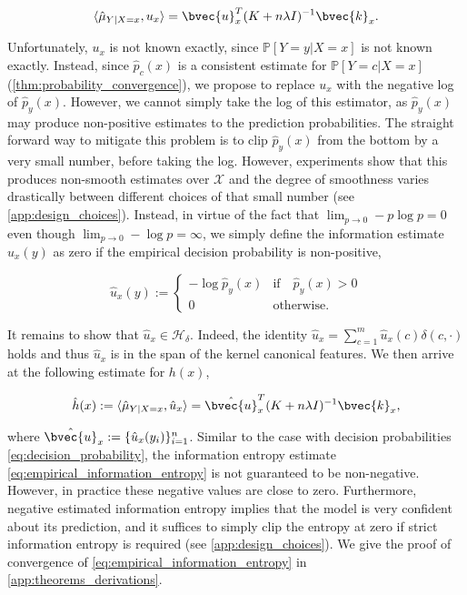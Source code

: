 \documentclass{article}
\begin{document}
	\begin{equation}
		\langle \hat{\mu}_{Y | X = x}, u_{x} \rangle = \bvec{u}_{x}^{T} (K + n \lambda I)^{-1} \bvec{k}_{x}.
	\end{equation}
	
	Unfortunately, $u_{x}$ is not known exactly, since $\mathbb{P}[Y = y | X = x]$ is not known exactly. Instead, since $\hat{p}_{c}(x)$ is a consistent estimate for $\mathbb{P}[Y = c | X = x]$ (\cref{thm:probability_convergence}), we propose to replace $u_{x}$ with the negative log of $\hat{p}_{y}(x)$. However, we cannot simply take the log of this estimator, as $\hat{p}_{y}(x)$ may produce non-positive estimates to the prediction probabilities. The straight forward way to mitigate this problem is to clip $\hat{p}_{y}(x)$ from the bottom by a very small number, before taking the log. However, experiments show that this produces non-smooth estimates over $\mathcal{X}$ and the degree of smoothness varies drastically between different choices of that small number (see \cref{app:design_choices}). Instead, in virtue of the fact that $\lim_{p \to 0} - p \log{p} = 0$ even though $\lim_{p \to 0} - \log{p} = \infty$, we simply define the information estimate $\hat{u}_{x}(y)$ as zero if the empirical decision probability is non-positive,
	
	\begin{equation}
		\hat{u}_{x}(y) := \begin{cases}
		- \log{\hat{p}_{y}(x)} & \mathrm{if } \quad \hat{p}_{y}(x) > 0 \\
		0 & \mathrm{otherwise}. \end{cases}
	\label{eq:empirical_information}
	\end{equation}
	
	It remains to show that $\hat{u}_{x} \in \mathcal{H}_{\delta}$. Indeed, the identity $\hat{u}_{x} = \sum_{c = 1}^{m} \hat{u}_{x}(c) \delta(c, \cdot)$ holds and thus $\hat{u}_{x}$ is in the span of the kernel canonical features. We then arrive at the following estimate for $h(x)$,
	
	\begin{equation}
		\hat{h}(x) := \langle \hat{\mu}_{Y | X = x}, \hat{u}_{x} \rangle = \hat{\bvec{u}}_{x}^{T} (K + n \lambda I)^{-1} \bvec{k}_{x},
		\label{eq:empirical_information_entropy}
	\end{equation}
	
	where $\hat{\bvec{u}}_{x} := \{\hat{u}_{x}(y_{i})\}_{i = 1}^{n}$. Similar to the case with decision probabilities \eqref{eq:decision_probability}, the information entropy estimate \eqref{eq:empirical_information_entropy} is not guaranteed to be non-negative. However, in practice these negative values are close to zero. Furthermore, negative estimated information entropy implies that the model is very confident about its prediction, and it suffices to simply clip the entropy at zero if strict information entropy is required (see \cref{app:design_choices}). We give the proof of convergence of \eqref{eq:empirical_information_entropy} in \cref{app:theorems_derivations}.
\end{document}
